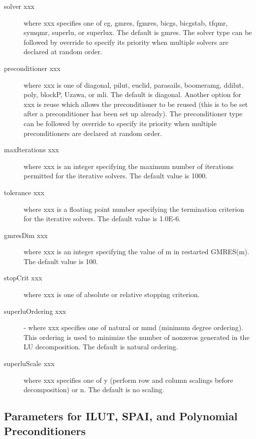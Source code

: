 \begin{description}
\item[solver xxx] where xxx specifies one of {\sf cg}, {\sf gmres},
           {\sf fgmres}, {\sf bicgs}, {\sf bicgstab}, {\sf tfqmr}, 
           {\sf symqmr}, {\sf superlu}, or {\sf superlux}.  The 
           default is {\sf gmres}.
           The solver type can be followed by {\sf override} to
           specify its priority when multiple solvers are declared
           at random order.
\item[preconditioner xxx] where xxx is one of {\sf diagonal}, {\sf pilut},
           {\sf euclid}, {\sf parasails}, {\sf boomeramg}, {\sf ddilut}, 
           {\sf poly}, {\sf blockP}, {\sf Uzawa}, or {\sf mli}. The 
           default is {\sf diagonal}.  Another option for 
           xxx is {\sf reuse} which allows the preconditioner to be reused 
           (this is to be set after a preconditioner has been set up already).
           The preconditioner type can be followed by {\sf override} to
           specify its priority when multiple preconditioners are declared
           at random order.
\item[maxIterations xxx] where xxx is an integer specifying the maximum 
           number of iterations permitted for the iterative solvers.
           The default value is 1000.
\item[tolerance xxx] where xxx is a floating point number specifying the 
           termination criterion for the iterative solvers.  The default 
           value is 1.0E-6.
\item[gmresDim xxx] where xxx is an integer specifying the value of m in
           restarted GMRES(m).  The default value is 100.
\item[stopCrit xxx] where xxx is one of {\sf absolute} or {\sf relative}
           stopping criterion.
\item[superluOrdering xxx] - where xxx specifies one of {\sf natural} or
           {\sf mmd} (minimum degree ordering).  This ordering
           is used to minimize the number of nonzeros generated
           in the LU decomposition.  The default is natural ordering.
\item[superluScale xxx] where xxx specifies one of {\sf y} (perform row
           and column scalings before decomposition) or {\sf n}.
           The default is no scaling.
\end{description}

\subsection{Parameters for ILUT, SPAI, and Polynomial Preconditioners}

